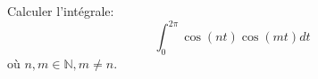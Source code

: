 Calculer l'int\'{e}grale: $${\int_{0}^{2\pi}}
\cos\left(  nt\right)  \cos\left(  mt\right)  dt$$ o\`{u} $n,m\in
\mathbb{N},m\neq n.$ \bigskip